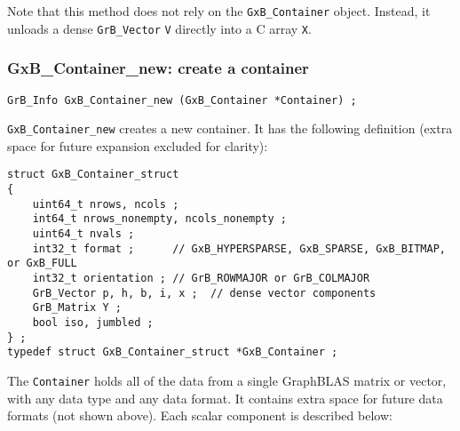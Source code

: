 Note that this method does not rely on the \verb'GxB_Container' object.
Instead, it unloads a dense \verb'GrB_Vector' \verb'V' directly into a
C array \verb'X'.

\subsubsection{{\sf GxB\_Container\_new:} create a container}
\label{container_new}

\begin{mdframed}[userdefinedwidth=6in]
{\footnotesize
\begin{verbatim}
GrB_Info GxB_Container_new (GxB_Container *Container) ;
\end{verbatim}
} \end{mdframed}

\verb'GxB_Container_new' creates a new container.  It has the following
definition (extra space for future expansion excluded for clarity):

\begin{mdframed}[userdefinedwidth=6in]
{\footnotesize
\begin{verbatim}
struct GxB_Container_struct
{
    uint64_t nrows, ncols ;
    int64_t nrows_nonempty, ncols_nonempty ;
    uint64_t nvals ;
    int32_t format ;      // GxB_HYPERSPARSE, GxB_SPARSE, GxB_BITMAP, or GxB_FULL
    int32_t orientation ; // GrB_ROWMAJOR or GrB_COLMAJOR
    GrB_Vector p, h, b, i, x ;  // dense vector components
    GrB_Matrix Y ;
    bool iso, jumbled ;
} ;
typedef struct GxB_Container_struct *GxB_Container ; \end{verbatim}
} \end{mdframed}

The \verb'Container' holds all of the data from a single GraphBLAS matrix or
vector, with any data type and any data format.  It contains extra space for
future data formats (not shown above).  Each scalar component is described
below:


